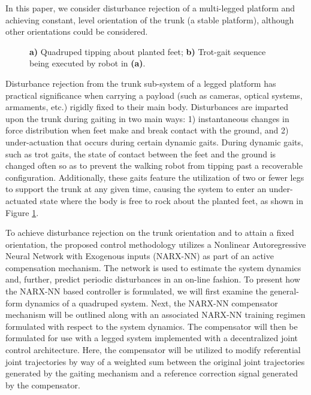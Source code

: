 In this paper, we consider disturbance rejection of a multi-legged platform and achieving constant, level orientation of the trunk (\IE a stable platform), 
although other orientations could be considered. 
	\begin{figure}[b!]
	\centering
		\begin{subfigure}{0.475\textwidth}
			\centering
			\caption{ }
		\end{subfigure}
		\begin{subfigure}{0.475\textwidth}
			\centering
			\caption{ }
		\end{subfigure}
		\caption{ \textbf{a)} Quadruped tipping about planted feet; \textbf{b)} Trot-gait sequence being executed by robot in \textbf{(a)}.}
		\label{fig::quadruped_walking}
	\end{figure}
Disturbance rejection from the trunk sub-system of a legged platform has practical significance when carrying a  
payload (such as cameras, optical systems, armaments, etc.) rigidly fixed to their main body. 
Disturbances are imparted upon the trunk during gaiting in two main ways: 1) instantaneous 
changes in force distribution when feet make and break contact with the ground, and 2) under-actuation that occurs
during certain dynamic gaits. During dynamic gaits, such as trot gaits, the state of contact between the feet 
and the ground is changed often so as to prevent the walking robot from tipping past a recoverable configuration. %
Additionally, these gaits feature the utilization of two or fewer legs to support the trunk at any given time, causing the 
system to enter an under-actuated state where the body is free to rock about the planted feet, as shown in Figure 
\ref{fig::quadruped_walking}.

To achieve disturbance rejection on the trunk orientation and to attain a fixed orientation, the proposed control methodology 
utilizes a Nonlinear Autoregressive Neural Network with Exogenous inputs (NARX-NN) as part of an active compensation mechanism. 
The network is used to estimate the system dynamics and, further, predict periodic disturbances in an on-line fashion. 
To present how the NARX-NN based controller is formulated, we will first examine the general-form dynamics of 
a quadruped system. Next, the NARX-NN compensator mechanism will be outlined along with an associated 
NARX-NN training regimen formulated with respect to the system dynamics. The compensator will then be
formulated for use with a legged system implemented with a decentralized joint control architecture. 
Here, the compensator will be utilized to modify referential joint trajectories by way of a weighted sum between
the original joint trajectories generated by the gaiting mechanism and a reference correction signal generated 
by the compensator.

